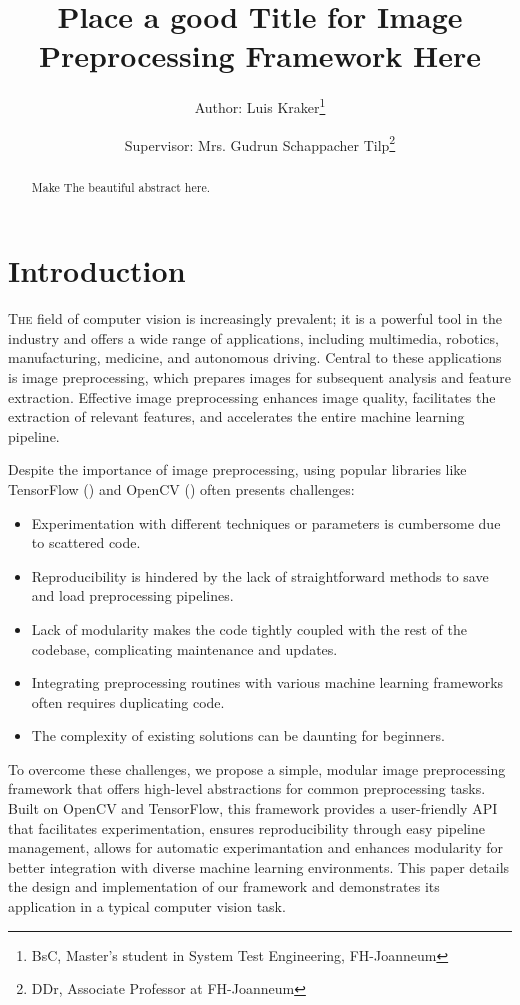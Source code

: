 \documentclass[journal ]{new-aiaa}
\title{Place a good Title for Image Preprocessing Framework Here}
\author{Author: Luis Kraker\footnote{BsC, Master's student in System Test Engineering, FH-Joanneum}}
\affil{FH-Joanneum, Graz 8020, Austria}
\author{Supervisor: Mrs. Gudrun Schappacher Tilp\footnote{DDr, Associate Professor at FH-Joanneum}}
\affil{FH-Joanneum, Graz 8020, Austria}
\begin{document}
\maketitle

\begin{abstract}
	Make The beautiful abstract here.
\end{abstract}



\section{Introduction}
\lettrine{T}{he} field of computer vision is increasingly prevalent; it is a powerful tool in the industry and offers a wide range of applications, including multimedia, robotics, manufacturing, medicine, and autonomous driving.\cite{bebis2002review}
Central to these applications is image preprocessing, which prepares images for subsequent analysis and feature extraction. Effective image preprocessing enhances image quality, facilitates the extraction of relevant features, and accelerates the entire machine learning pipeline.\cite{gonzalez2002digital}\cite{nelson2020image}\cite{krig2014image}

Despite the importance of image preprocessing, using popular libraries like TensorFlow (\cite{tensorflow2015}) and OpenCV (\cite{opencv2000}) often presents challenges:
\begin{itemize}
    \item Experimentation with different techniques or parameters is cumbersome due to scattered code.
    \item Reproducibility is hindered by the lack of straightforward methods to save and load preprocessing pipelines.
    \item Lack of modularity makes the code tightly coupled with the rest of the codebase, complicating maintenance and updates.
    \item Integrating preprocessing routines with various machine learning frameworks often requires duplicating code.
    \item The complexity of existing solutions can be daunting for beginners.
\end{itemize}

To overcome these challenges, we propose a simple, modular image preprocessing framework that offers high-level abstractions for common preprocessing tasks. Built on OpenCV and TensorFlow, this framework provides a user-friendly API that facilitates experimentation, ensures reproducibility through easy pipeline management, allows for automatic experimantation and enhances modularity for better integration with diverse machine learning environments. This paper details the design and implementation of our framework and demonstrates its application in a typical computer vision task.
\end{document}
